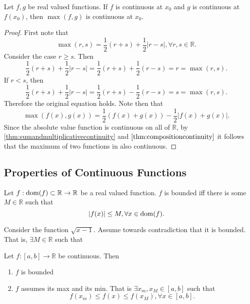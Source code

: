 \documentclass[../notes.tex]{subfiles}
\begin{document}
\begin{theorem}
    \label{thm:compositioncontinuity}
    Let $f,g$ be real valued functions. If $f$ is continuous at $x_0$ and $g$ is continuous at $f(x_0)$, then $\max(f,g)$ is continuous at $x_0$.
\end{theorem}

\begin{proof}
    First note that
    \[
        \max(r,s) = \frac{1}{2} (r + s) + \frac{1}{2} |r - s|, \forall r,s \in \mathbb{R}
    .\]
    Consider the case $r \geq s$. Then
    \[
        \frac{1}{2}(r+s) + \frac{1}{2} |r-s| = \frac{1}{2} (r+s) + \frac{1}{2} (r-s) = r = \max(r,s)
    .\]
    If $r < s$, then
    \[
        \frac{1}{2}(r+s) + \frac{1}{2} |r-s| = \frac{1}{2} (r+s) - \frac{1}{2} (r-s) = s = \max(r,s)
    .\]
    Therefore the original equation holds. Note then that
    \[
        \max(f(x), g(x)) = \frac{1}{2} (f(x) + g(x)) - \frac{1}{2} |f(x) + g(x)|
    .\]
    Since the absolute value function is continuous on all of $\mathbb{R}$, by \ref{thm:sumandmultiplicativecontinuity} and $\ref{thm:compositioncontinuity}$ it follows that the maximum of two functions in also continuous.
\end{proof}

\subsection{Properties of Continuous Functions}

\begin{definition}
    Let $f : \operatorname{dom}(f) \subset \mathbb{R} \to \mathbb{R}$ be a real valued function. $f$ is bounded iff there is some $M \in \mathbb{R}$ such that
    \[
        |f(x)| \leq M, \forall x \in \operatorname{dom}(f)
    .\]
\end{definition}

\begin{example}
    Consider the function $\sqrt{x-1}$. Assume towards contradiction that it is bounded. That is, $\exists M \in \mathbb{R}$ such that 
\end{example}

\begin{theorem}
    Let $f : [a,b] \to \mathbb{R}$ be continuous. Then
    \begin{enumerate}
        \item $f$ is bounded
        \item $f$ assumes its max and its min. That is $\exists x_m, x_M \in [a,b]$ such that 
            \[
            f(x_m) \leq f(x) \leq f(x_M), \forall x \in [a,b]
            .\]
    \end{enumerate}
\end{theorem}
\end{document}
